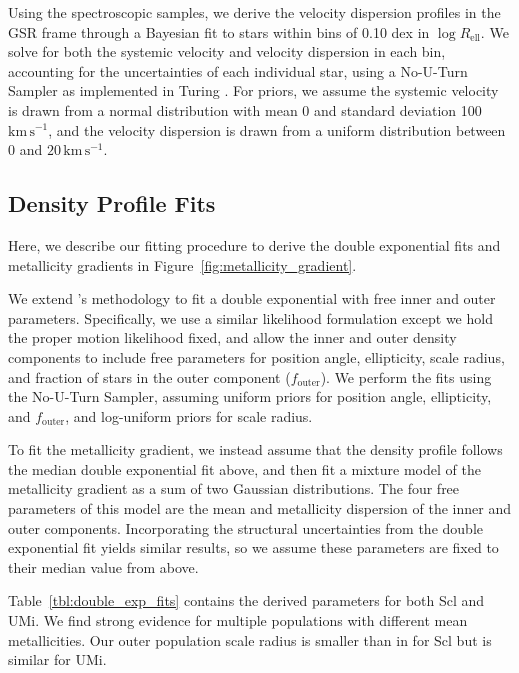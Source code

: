 \documentclass[linenumbers, twocolumn, twocolappendix]{aastex701}
\newcommand{\kms}{\mathrm{km\,s^{-1}}}
\newcommand{\jj}{\citetalias{jensen+2024}}
\begin{document}
Using the spectroscopic samples, we derive the velocity dispersion profiles in the GSR frame through a Bayesian fit to stars within bins of 0.10 dex in $\log R_\textrm{ell}$. We solve for both the systemic velocity and velocity dispersion in each bin, accounting for the uncertainties of each individual star, using a No-U-Turn Sampler \citep[NUTS, an adaptive Hamiltonian Monte Carlo method][]{NUTS} as implemented in Turing \citep{turing}. For priors, we assume the systemic velocity is drawn from a normal distribution with mean 0 and standard deviation 100\,$\kms$, and the velocity dispersion is drawn from a uniform distribution between 0 and $20\,\kms$. 


\subsection{Density Profile Fits} 

Here, we describe our fitting procedure to derive the double exponential fits and metallicity gradients in Figure~\ref{fig:metallicity_gradient}.

We extend \jj{}'s methodology to fit a double exponential with free inner and outer parameters. Specifically, we use a similar likelihood formulation except we hold the proper motion likelihood fixed, and allow the inner and outer density components to include free parameters for position angle, ellipticity, scale radius, and fraction of stars in the outer component ($f_\text{outer}$). We perform the fits using the No-U-Turn Sampler, assuming uniform priors for position angle, ellipticity, and $f_\text{outer}$, and log-uniform priors for scale radius.

To fit the metallicity gradient, we instead assume that the density profile follows the median double exponential fit above, and then fit a mixture model of the metallicity gradient as a sum of two Gaussian distributions. The four free parameters of this model are the mean and metallicity dispersion of the inner and outer components. Incorporating the structural uncertainties from the double exponential fit yields similar results, so we assume these parameters are fixed to their median value from above.

Table~\ref{tbl:double_exp_fits} contains the derived parameters for both Scl and UMi. We find strong evidence for multiple populations with different mean metallicities. Our outer population scale radius is smaller than in \jj{} for Scl but is similar for UMi. 
\end{document}

